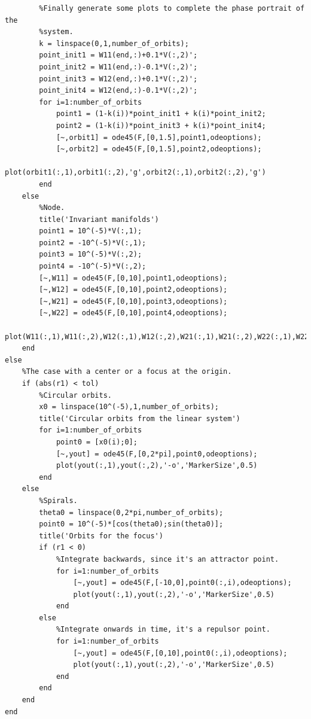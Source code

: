\documentclass[twoside]{article}
\begin{document}
\begin{verbatim}
        %Finally generate some plots to complete the phase portrait of the
        %system.
        k = linspace(0,1,number_of_orbits);
        point_init1 = W11(end,:)+0.1*V(:,2)';
        point_init2 = W11(end,:)-0.1*V(:,2)';
        point_init3 = W12(end,:)+0.1*V(:,2)';
        point_init4 = W12(end,:)-0.1*V(:,2)';
        for i=1:number_of_orbits
            point1 = (1-k(i))*point_init1 + k(i)*point_init2;
            point2 = (1-k(i))*point_init3 + k(i)*point_init4;
            [~,orbit1] = ode45(F,[0,1.5],point1,odeoptions);
            [~,orbit2] = ode45(F,[0,1.5],point2,odeoptions);
            plot(orbit1(:,1),orbit1(:,2),'g',orbit2(:,1),orbit2(:,2),'g')
        end
    else
        %Node.
        title('Invariant manifolds')
        point1 = 10^(-5)*V(:,1);
        point2 = -10^(-5)*V(:,1);
        point3 = 10^(-5)*V(:,2);
        point4 = -10^(-5)*V(:,2);
        [~,W11] = ode45(F,[0,10],point1,odeoptions);
        [~,W12] = ode45(F,[0,10],point2,odeoptions);
        [~,W21] = ode45(F,[0,10],point3,odeoptions);
        [~,W22] = ode45(F,[0,10],point4,odeoptions);
        plot(W11(:,1),W11(:,2),W12(:,1),W12(:,2),W21(:,1),W21(:,2),W22(:,1),W22(:,2),'r');
    end
else
    %The case with a center or a focus at the origin.
    if (abs(r1) < tol)
        %Circular orbits.
        x0 = linspace(10^(-5),1,number_of_orbits);
        title('Circular orbits from the linear system')
        for i=1:number_of_orbits
            point0 = [x0(i);0];
            [~,yout] = ode45(F,[0,2*pi],point0,odeoptions);
            plot(yout(:,1),yout(:,2),'-o','MarkerSize',0.5)
        end
    else
        %Spirals.
        theta0 = linspace(0,2*pi,number_of_orbits);
        point0 = 10^(-5)*[cos(theta0);sin(theta0)];
        title('Orbits for the focus')
        if (r1 < 0)
            %Integrate backwards, since it's an attractor point.
            for i=1:number_of_orbits
                [~,yout] = ode45(F,[-10,0],point0(:,i),odeoptions);
                plot(yout(:,1),yout(:,2),'-o','MarkerSize',0.5)
            end
        else
            %Integrate onwards in time, it's a repulsor point.
            for i=1:number_of_orbits
                [~,yout] = ode45(F,[0,10],point0(:,i),odeoptions);
                plot(yout(:,1),yout(:,2),'-o','MarkerSize',0.5)
            end
        end
    end
end
\end{verbatim}
\end{document}
